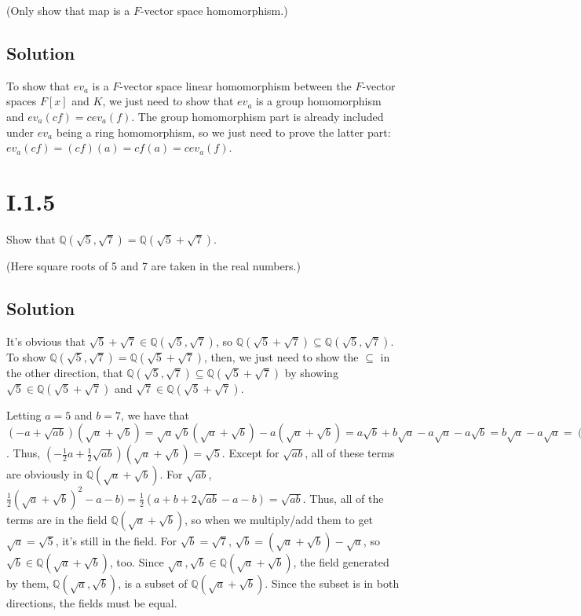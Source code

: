 \documentclass[fleqn]{article}
\begin{document}
    (Only show that map is a $F$-vector space homomorphism.)
        
        \subsection{Solution}
        To show that $ev_a$ is a $F$-vector space linear homomorphism between the $F$-vector spaces $F[x]$ and $K$, we just need to show that $ev_a$ is a group homomorphism and $ev_a(cf) = c ev_a(f)$.  The group homomorphism part is already included under $ev_a$ being a ring homomorphism, so we just need to prove the latter part: $ev_a(cf) = (cf)(a) = cf(a) = c ev_a(f)$.
    
    \section{I.1.5}
    Show that $\mathbb{Q}(\sqrt{5}, \sqrt{7}) = \mathbb{Q}(\sqrt{5} + \sqrt{7})$.
    
    (Here square roots of 5 and 7 are taken in the real numbers.)
        
        \subsection{Solution}
        It's obvious that $\sqrt{5} + \sqrt{7} \in \mathbb{Q}(\sqrt{5}, \sqrt{7})$, so $\mathbb{Q}(\sqrt{5} + \sqrt{7}) \subseteq \mathbb{Q}(\sqrt{5}, \sqrt{7})$.  To show $\mathbb{Q}(\sqrt{5}, \sqrt{7}) = \mathbb{Q}(\sqrt{5} + \sqrt{7})$, then, we just need to show the $\subseteq$ in the other direction, that $\mathbb{Q}(\sqrt{5}, \sqrt{7}) \subseteq \mathbb{Q}(\sqrt{5} + \sqrt{7})$ by showing $\sqrt{5} \in \mathbb{Q}(\sqrt{5} + \sqrt{7})$ and $\sqrt{7} \in \mathbb{Q}(\sqrt{5} + \sqrt{7})$.
        
        Letting $a = 5$ and $b = 7$, we have that $(-a + \sqrt{ab})(\sqrt{a} + \sqrt{b}) = \sqrt{a}\sqrt{b}(\sqrt{a} + \sqrt{b}) - a(\sqrt{a} + \sqrt{b}) = a \sqrt{b} + b \sqrt{a} - a \sqrt{a} - a \sqrt{b} = b \sqrt{a} - a \sqrt{a} = (b - a) \sqrt{a} = (7 - 5) \sqrt{5} = 2 \sqrt{5}$.  Thus, $(-\frac{1}{2} a + \frac{1}{2}\sqrt{ab})(\sqrt{a} + \sqrt{b}) = \sqrt{5}$.  Except for $\sqrt{ab}$, all of these terms are obviously in $\mathbb{Q}(\sqrt{a} + \sqrt{b})$.  For $\sqrt{ab}$, $\frac{1}{2}(\sqrt{a} + \sqrt{b})^2 - a - b) = \frac{1}{2}(a + b + 2\sqrt{ab} - a - b) = \sqrt{ab}$.  Thus, all of the terms are in the field $\mathbb{Q}(\sqrt{a} + \sqrt{b})$, so when we multiply/add them to get $\sqrt{a} = \sqrt{5}$, it's still in the field.  For $\sqrt{b} = \sqrt{7}$, $\sqrt{b} = (\sqrt{a} + \sqrt{b}) - \sqrt{a}$, so $\sqrt{b} \in \mathbb{Q}(\sqrt{a} + \sqrt{b})$, too.  Since $\sqrt{a}, \sqrt{b} \in \mathbb{Q}(\sqrt{a} + \sqrt{b})$, the field generated by them, $\mathbb{Q}(\sqrt{a}, \sqrt{b})$, is a subset of $\mathbb{Q}(\sqrt{a} + \sqrt{b})$.  Since the subset is in both directions, the fields must be equal.
    
\end{document}
